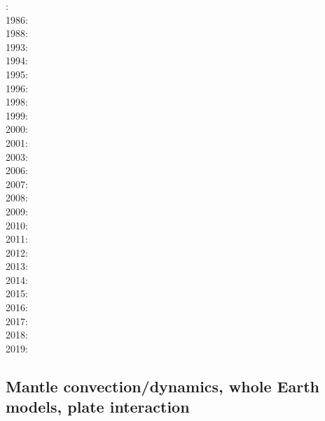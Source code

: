 {\scriptsize
{}: \cite{scst84}\cite{mcke84}\\
1986: \cite{scst86}\\
1988: \cite{scot88}\\
1993: \cite{spie93}\\
1994: \cite{jhpp94}\\
1995: \cite{bisc95}\\
1996: \cite{laki96}\\
1998: \cite{rabg98}\\
1999: \cite{devv99}\\
2000: \cite{elha00}\\
2001: \cite{bers01}\\
2003: \cite{beri03}\\
2006: \cite{onmm06}\\
2007: \cite{srrb07}\cite{mohb07}\cite{elki07}\cite{copb07}\\
2008: \cite{hets08}\cite{hest08}\\
2009: \cite{bavi09}\\
2010: \cite{baiv10}\cite{habl10}\cite{cows10}\\
2011: \cite{baiv11}\cite{zhgy11}\cite{zhgh11}\cite{bics11}\\
2012: \cite{yatd12}\cite{kasc12b}\cite{ullc12}\\
2013: \cite{kemk13}\cite{mofm13}\\
2014: \cite{kast14}\\
2015: \cite{tukb15}\cite{moba15}\\
2016: \cite{keka16}\\
2017: \cite{dilc17}\\
2018: \cite{lorg18}\\
2019: \cite{dagg19}
}

\subsection{Mantle convection/dynamics, whole Earth models, plate interaction}

